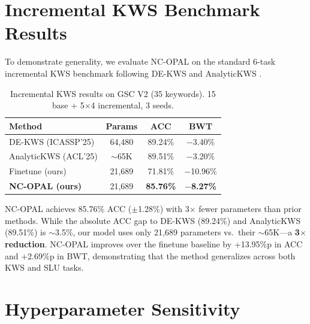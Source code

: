 \documentclass[11pt]{article}
\begin{document}



\appendix

\section{Incremental KWS Benchmark Results}
\label{app:kws}

To demonstrate generality, we evaluate NC-OPAL on the standard 6-task incremental KWS benchmark following DE-KWS \cite{dekws2025} and AnalyticKWS \cite{analytickws2025}.

\begin{table}[h]
\centering
\small
\caption{Incremental KWS results on GSC V2 (35 keywords). 15 base + 5$\times$4 incremental, 3 seeds.}
\label{tab:kws}
\begin{tabular}{@{}lccc@{}}
\toprule
\textbf{Method} & \textbf{Params} & \textbf{ACC} & \textbf{BWT} \\
\midrule
DE-KWS (ICASSP'25)       & 64,480  & 89.24\% & $-$3.40\% \\
AnalyticKWS (ACL'25)      & $\sim$65K & 89.51\% & $-$3.20\% \\
\midrule
Finetune (ours)           & 21,689  & 71.81\% & $-$10.96\% \\
\textbf{NC-OPAL (ours)}  & 21,689  & \textbf{85.76\%} & \textbf{$-$8.27\%} \\
\bottomrule
\end{tabular}
\end{table}

NC-OPAL achieves 85.76\% ACC ($\pm$1.28\%) with 3$\times$ fewer parameters than prior methods.
While the absolute ACC gap to DE-KWS (89.24\%) and AnalyticKWS (89.51\%) is $\sim$3.5\%, our model uses only 21,689 parameters vs.\ their $\sim$65K---a \textbf{3$\times$ reduction}.
NC-OPAL improves over the finetune baseline by +13.95\%p in ACC and +2.69\%p in BWT, demonstrating that the method generalizes across both KWS and SLU tasks.

\section{Hyperparameter Sensitivity}
\label{app:hyperparam}
\end{document}
